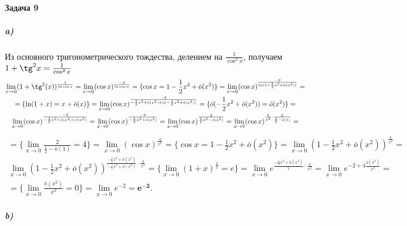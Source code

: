 \documentclass[12pt]{article}
\begin{document}
    \paragraph{Задача 9}
        \subparagraph{a)}
            Из основного тригонометрического тождества, делением на $\frac{1}{\cos^2{x}}$, получаем $1 + \tg^2{x} = \frac{1}{\cos^2{x}}$
            \begin{gather*}
                \lim_{x \to 0} (1 + \tg^2(x))^{\frac{1}{\ln{\cos{x}}}} =
                \lim_{x \to 0} (\cos{x})^{\frac{-2}{\ln{\cos{x}}}} =
                \{\cos{x} = 1 - \frac{1}{2}x^2 + \bar{o}(x^2)\} =
                \lim_{x \to 0} (\cos{x})^{\frac{-2}{\ln(1 - \frac{1}{2}x^2 + \bar{o}(x^2))}} =\\
                = \{\ln(1 + x) = x + \bar{o}(x)\} =
                \lim_{x \to 0} (\cos{x})^{\frac{-2}{-\frac{1}{2}x^2 + \bar{o}(x^2) + \bar{o}(-\frac{1}{2}x^2 + \bar{o}(x^2))}} =
                \{\bar{o}(-\frac{1}{2}x^2 + \bar{o}(x^2)) = \bar{o}(x^2)\} =\\
                \lim_{x \to 0} (\cos{x})^{\frac{-2}{-\frac{1}{2}x^2 + \bar{o}(x^2) + \bar{o}(x^2)}} =
                \lim_{x \to 0} (\cos{x})^{\frac{-2}{-\frac{1}{2}x^2 + \bar{o}(x^2)}} =
                \lim_{x \to 0} (\cos{x})^{\frac{2}{\frac{1}{2}x^2 - \bar{o}(x^2)}} =
                \lim_{x \to 0} (\cos{x})^{\frac{1}{x^2} \cdot \frac{2}{\frac{1}{2} - \bar{o}(1)}} =
            \end{gather*}
            \newpage
            \begin{gather*}
                = \{\lim_{x \to 0} \frac{2}{\frac{1}{2} - \bar{o}(1)} = 4\} =
                \lim_{x \to 0} (\cos{x})^{\frac{4}{x^2}} =
                \{\cos{x} = 1 - \frac{1}{2}x^2 + \bar{o}(x^2)\} =
                \lim_{x \to 0} (1 - \frac{1}{2}x^2 + \bar{o}(x^2))^{\frac{4}{x^2}} =\\
                \lim_{x \to 0} (1 - \frac{1}{2}x^2 + \bar{o}(x^2))^{\frac{- \frac{1}{2}x^2 + \bar{o}(x^2)}{-\frac{1}{2}x^2 + \bar{o}(x^2)} \cdot \frac{4}{x^2}} =
                \{\lim_{x \to 0} (1 + x)^{\frac{1}{x}} = e\} = 
                \lim_{x \to 0} e^{\frac{- \frac{1}{2}x^2 + \bar{o}(x^2)}{1} \cdot \frac{4}{x^2}} =
                \lim_{x \to 0} e^{-2 + 4\frac{\bar{o}(x^2)}{x^2}} =\\
                = \{\lim_{x \to 0} \frac{\bar{o}(x^2)}{x^2} = 0\} =
                \lim_{x \to 0} e^{-2} = \mathbf{e^{-2}}.
            \end{gather*}
        \subparagraph{b)}
\end{document}
